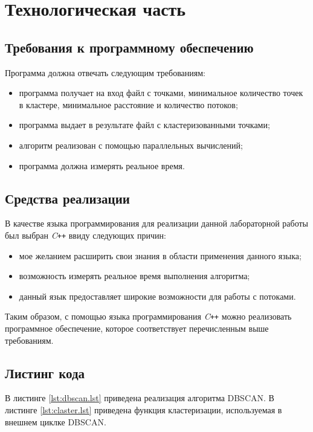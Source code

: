 \chapter{Технологическая часть}

\section{Требования к программному обеспечению}

Программа должна отвечать следующим требованиям:
\begin{itemize}[label=---]
	\item программа получает на вход файл с точками, минимальное количество точек в кластере, минимальное расстояние и количество потоков;
	\item программа выдает в результате файл с кластеризованными точками;
	\item алгоритм реализован с помощью параллельных вычислений;
	\item программа должна измерять реальное время.
\end{itemize}

\section{Средства реализации}

В качестве языка программирования для реализации данной лабораторной работы был выбран \textit{C\texttt{++}} ввиду следующих причин:
\begin{itemize}[label=---]
	\item мое желанием расширить свои знания в области применения данного языка;
	\item возможность измерять реальное время выполнения алгоритма;
	\item данный язык предоставляет широкие возможности для работы с потоками.
\end{itemize}

Таким образом, с помощью языка программирования \textit{C\texttt{++}} можно реализовать программное обеспечение, которое соответствует перечисленным выше требованиям.

\section{Листинг кода}

В листинге \ref{lst:dbscan.lst} приведена реализация алгоритма DBSCAN.
В листинге \ref{lst:claster.lst} приведена функция кластеризации, используемая в внешнем циклке DBSCAN.
\clearpage
{}
\clearpage	
{}
\clearpage

